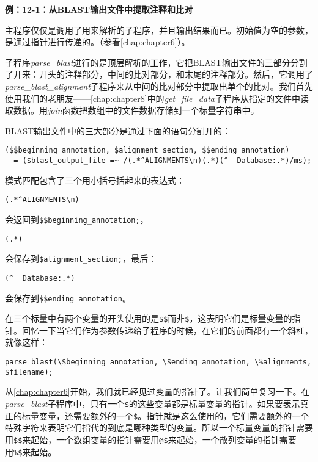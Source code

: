 \textbf{例：12-1：从BLAST输出文件中提取注释和比对}


主程序仅仅是调用了用来解析的子程序，并且输出结果而已。初始值为空的参数，是通过指针进行传递的。（参看\autoref{chap:chapter6}）。

子程序\textit{parse\_blast}进行的是顶层解析的工作，它把BLAST输出文件的三部分分割了开来：开头的注释部分，中间的比对部分，和末尾的注释部分。然后，它调用了\textit{parse\_blast\_alignment}子程序来从中间的比对部分中提取出单个的比对。我们首先使用我们的老朋友——\autoref{chap:chapter8}中的\textit{get\_file\_data}子程序从指定的文件中读取数据。用\textit{join}函数把数组中的文件数据存储到一个标量字符串中。

BLAST输出文件中的三大部分是通过下面的语句分割开的：

\begin{lstlisting}
($$beginning_annotation, $alignment_section, $$ending_annotation)
  = ($blast_output_file =~ /(.*^ALIGNMENTS\n)(.*)(^  Database:.*)/ms);
\end{lstlisting}

模式匹配包含了三个用小括号括起来的表达式：

\begin{lstlisting}
(.*^ALIGNMENTS\n) 
\end{lstlisting}

会返回到\verb|$$beginning_annotation;|，

\begin{lstlisting}
(.*) 
\end{lstlisting}

会保存到\verb|$alignment_section;|，最后：

\begin{lstlisting}
(^  Database:.*) 
\end{lstlisting}

会保存到\verb|$$ending_annotation|。

在三个标量中有两个变量的开头使用的是\verb|$$|而非\verb|$|，这表明它们是标量变量的指针。回忆一下当它们作为参数传递给子程序的时候，在它们的前面都有一个斜杠，就像这样：

\begin{lstlisting}
parse_blast(\$beginning_annotation, \$ending_annotation, \%alignments, $filename);
\end{lstlisting}

从\autoref{chap:chapter6}开始，我们就已经见过变量的指针了。让我们简单复习一下。在\textit{parse\_blast}子程序中，只有一个\verb|$|的这些变量都是标量变量的指针。如果要表示真正的标量变量，还需要额外的一个\verb|$|。指针就是这么使用的，它们需要额外的一个特殊字符来表明它们指代的到底是哪种类型的变量。所以一个标量变量的指针需要用\verb|$$|来起始，一个数组变量的指针需要用\verb|@$|来起始，一个散列变量的指针需要用\verb|%$|来起始。

